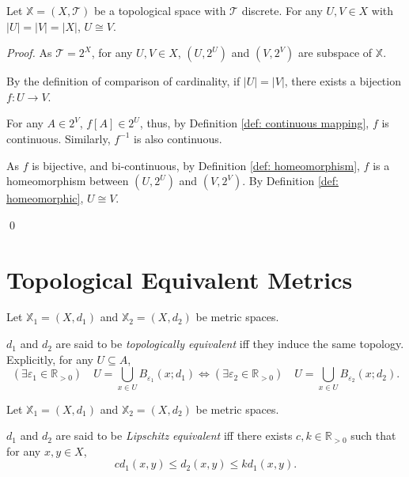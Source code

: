 \begin{example}
	Let $\mathbb X = (X, \mathcal T)$ be a topological space with $\mathcal T$ discrete. For any $U,V \in X$ with $|U| = |V| = |X|$, $U \cong V$.
	
	\begin{proof}
		As $\mathcal T = 2^X$, for any $U, V \in X$, $(U, 2^U )$ and $( V, 2^V )$ are subspace of $\mathbb X$.
		
		By the definition of comparison of cardinality, if $|U| = |V|$, there exists a bijection $f: U \to V$.
		
		For any $A \in 2^V$, $f[A] \in 2^U$, thus, by Definition \ref{def: continuous mapping}, $f$ is continuous. Similarly, $f^{-1}$ is also continuous.
		
		As $f$ is bijective, and bi-continuous, by Definition \ref{def: homeomorphism}, $f$ is a homeomorphism between $(U, 2^U)$ and $(V, 2^V)$. By Definition \ref{def: homeomorphic}, $U \cong V$.
		
		\qed
	\end{proof}
\end{example}


\section{Topological Equivalent Metrics}


\begin{definition}
	\label{def: topologically equivalent metric space}
	Let $\mathbb X_1 = (X, d_1)$ and $\mathbb X_2 = (X, d_2)$ be metric spaces.
	
	$d_1$ and $d_2$ are said to be \textit{topologically equivalent} iff they induce the same topology. Explicitly, for any $U \subseteq A$,
	$$
	(\exists \varepsilon_1 \in \mathbb R_{> 0}) \quad U = \bigcup_{x \in U} B_{\varepsilon_1}(x; d_1) \iff (\exists \varepsilon_2 \in \mathbb R_{> 0}) \quad U = \bigcup_{x \in U} B_{\varepsilon_2} (x; d_2).
	$$
\end{definition}


\begin{definition}
	\label{def: Lipschitz equivalent}
	Let $\mathbb X_1 = (X, d_1)$ and $\mathbb X_2 = (X, d_2)$ be metric spaces.
	
	$d_1$ and $d_2$ are said to be \textit{Lipschitz equivalent} iff there exists $c, k \in \mathbb R_{> 0}$ such that for any $x,y \in X$,
	$$
	c d_1(x,y) \le d_2(x,y) \le kd_1 (x, y).
	$$
\end{definition}


